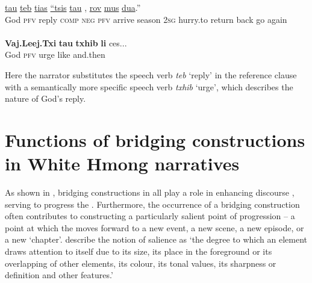\documentclass[output=paper]{LSP/langsci}
\begin{document}
\begin{exe}
\ex \label{Jaex:14ab}
\begin{xlist}
\ex \label{Jaex:14a}
\gll  \underline{} \underline{tau} \underline{teb} \underline{tias} \underline{``tsis} \underline{tau}     \underline{} \underline{}, \underline{} \underline{} \underline{rov} \underline{} \underline{mus} \underline{dua}.'' \\
  God \textsc{pfv} reply \textsc{comp} \textsc{neg} \textsc{pfv} arrive season 2\textsc{sg} hurry.to return back go again\\
\glt {}\\
\ex \label{Jaex:14b}
\gll \textbf{Vaj.Leej.Txi} \textbf{tau}  \textbf{txhib} \textbf{li} ces... \\     	      
     God \textsc{pfv} urge like and.then\\
\glt {} \citep[][17]{vang90}
\end{xlist}
\end{exe}

\noindent
Here the narrator substitutes the speech verb \textit{teb} `reply' in the reference clause with a semantically more specific speech verb \textit{txhib} `urge', which describes the nature of God’s reply. 


\section{Functions of bridging constructions in White Hmong narratives} 
\label{JaFunctions}
As shown in , bridging constructions in  all play a role in enhancing discourse , serving to progress the . Furthermore, the occurrence of a bridging construction often contributes to constructing a particularly salient point of progression – a point at which the  moves forward to a new event, a new scene, a new episode, or a new ‘chapter’. \citet[][210]{kress06} describe the notion of salience as ‘the degree to which an element draws attention to itself due to its size, its place in the foreground or its overlapping of other elements, its colour, its tonal values, its sharpness or definition and other features.’ 
\end{document}
